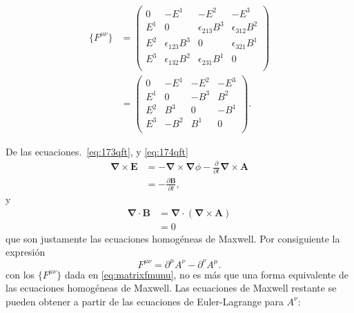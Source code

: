 \begin{align}
  \{F^{\mu\nu}\}  &=
  \begin{pmatrix}
    0 &-E^1   &-E^2   &-E^3   \\    
    E^1&0     &\epsilon_{213}B^3&\epsilon_{312}B^2\\
    E^2&\epsilon_{123}B^3&0     &\epsilon_{321}B^1\\
    E^3&\epsilon_{132}B^2&\epsilon_{231}B^1&0\\
  \end{pmatrix}\nonumber\\
  &=
\label{eq:matrixfmunu}
  \begin{pmatrix}
    0 &-E^1&-E^2&-E^3   \\    
    E^1&0  &-B^3&B^2\\
    E^2&B^3 &0  &-B^1\\
    E^3&-B^2&B^1 &0\\
  \end{pmatrix}.
\end{align}


De las ecuaciones.~\eqref{eq:173qft}, y \eqref{eq:174qft}
\begin{align*}
  \boldsymbol{\nabla}\times \mathbf{E}&=-\boldsymbol{\nabla}\times \boldsymbol{\nabla}\phi-\frac{\partial}{\partial t}\boldsymbol{\nabla}\times \mathbf{A}\\
  &=-\frac{\partial\mathbf{B}}{\partial t},
\end{align*}
y
\begin{align*}
  \boldsymbol{\nabla}\cdot\mathbf{B}&=\boldsymbol{\nabla}\cdot(\boldsymbol{\nabla}\times \mathbf{A})\\
  &=0
\end{align*}
que son justamente las ecuaciones homogéneas de  Maxwell. Por
consiguiente la expresión  
 \begin{equation}
  \label{eq:fmunu}
    F^{\mu\nu}=\partial^\mu A^\nu-\partial^\nu A^\mu.
\end{equation}
con los $\{F^{\mu\nu}\}$ dada en \eqref{eq:matrixfmunu}, no es más que
una forma equivalente de las ecuaciones homogéneas de Maxwell. Las
ecuaciones de Maxwell restante se pueden obtener a partir de las
ecuaciones de Euler-Lagrange para $A^\nu$:



